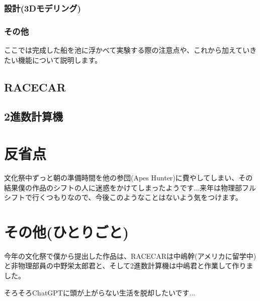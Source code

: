 \documentclass[b5paper,papersize,twoside,dvipdfmx]{jsarticle}
\begin{document}
\subsubsection{設計(3Dモデリング)}

\subsubsection{その他}
ここでは完成した船を池に浮かべて実験する際の注意点や、これから加えていきたい機能について説明します。
\subsection{RACECAR}

\subsection{2進数計算機}

\section{反省点}
文化祭中ずっと朝の準備時間を他の参団(Apes Hunter)に費やしてしまい、その結果僕の作品のシフトの人に迷惑をかけてしまったようです...来年は物理部フルシフトで行くつもりなので、今後このようなことはないよう気をつけます。

\section{その他(ひとりごと)}
今年の文化祭で僕から提出した作品は、RACECARは中嶋幹(アメリカに留学中)と非物理部員の中野栄太郎君と、そして2進数計算機は中嶋君と作業して作りました。

そろそろChatGPTに頭が上がらない生活を脱却したいです...
\end{document}
